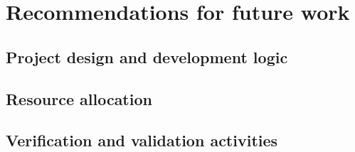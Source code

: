 \section{Recommendations for future work}\label{cha:futurework}

\subsection{Project design and development logic} \label{sec:danddlogic}


\subsection{Resource allocation} \label{sec:resources}


\subsection{Verification and validation activities} \label{sec:futurevandv}

